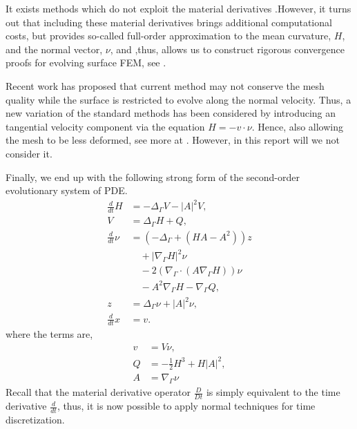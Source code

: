 It exists methods which do not exploit the material derivatives \cite{bonito2010parametric, bartezzaghi2016isogeometric}.However, it turns out that including these material derivatives brings additional computational costs, but provides so-called full-order
approximation to the mean curvature, $H$, and the normal vector, $\nu $, and ,thus, allows us to construct rigorous convergence proofs for evolving surface FEM, see \cite{kovacs2021convergent, binz2022convergent}.

Recent work has proposed that current method may not conserve the mesh quality while the surface is restricted to evolve along the normal velocity. Thus, a new variation of the standard methods has been considered by introducing an tangential
velocity component via the equation  $H = - v\cdot \nu  $. Hence, also allowing the mesh to be less deformed, see more at \cite{hu2022evolving}. However, in this report will we not consider it.

Finally, we end up with the following strong form of the second-order evolutionary system of PDE.
\begin{subequations}
    \label{eq:WE_strong_form}
    \begin{align}
\frac{d}{dt}H & = -  \Delta _{\Gamma }V - \left\lvert A \right\rvert ^2 V    , \\
V  & =   \Delta _{\Gamma } H + Q, \\
\frac{d}{dt} \nu & = \left( -\Delta _{\Gamma } + \left( HA - A^2 \right)  \right) z \nonumber \\
& \quad   + \left\lvert \nabla _{\Gamma } H \right\rvert ^2   \nu \nonumber  \\
 & \quad - 2\left( \nabla _{\Gamma }\cdot \left( A \nabla _{\Gamma } H \right)  \right) \nu \nonumber  \\
  & \quad  -A^2 \nabla _{\Gamma } H  - \nabla _{\Gamma } Q, \\
z & = \Delta  _{\Gamma } \nu  + \left\lvert A \right\rvert ^2 \nu,\\
\frac{d}{dt} x  &= v.
    \end{align}
\end{subequations}
where the terms are,
\[
    \begin{split}
v & = V\nu, \\
Q & =  - \frac{1}{2} H^{3} + H \left\lvert A \right\rvert^2, \\
A & = \nabla _{\Gamma } \nu
    \end{split}
\]
Recall that the material derivative operator $\frac{D}{Dt} $ is simply equivalent to the time derivative $\frac{d}{dt}$, thus, it is now possible to apply normal techniques for time discretization.

